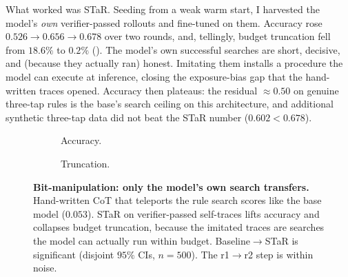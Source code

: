 \documentclass[11pt]{article}
\begin{document}
What worked was STaR. Seeding from a weak warm start, I harvested the model's \emph{own}
verifier-passed rollouts and fine-tuned on them. Accuracy rose $0.526\!\to\!0.656\!\to\!0.678$
over two rounds, and, tellingly, budget truncation fell from $18.6\%$ to $0.2\%$
(). The model's own successful searches are short, decisive, and (because
they actually ran) honest. Imitating them installs a procedure the model can execute at
inference, closing the exposure-bias gap that the hand-written traces opened. Accuracy then
plateaus: the residual $\approx\!0.50$ on genuine three-tap rules is the base's search
ceiling on this architecture, and additional synthetic three-tap data did not beat the STaR
number ($0.602 < 0.678$).

\begin{figure}[tbp]
\centering
\begin{subfigure}{0.48\textwidth}
\centering
{}
\caption{Accuracy.}
\end{subfigure}\hfill
\begin{subfigure}{0.48\textwidth}
\centering
{}
\caption{Truncation.}
\end{subfigure}
\caption{\textbf{Bit-manipulation: only the model's own search transfers.} Hand-written CoT
that teleports the rule search scores like the base model ($0.053$). STaR on
verifier-passed self-traces lifts accuracy and collapses budget truncation, because the
imitated traces are searches the model can actually run within budget. Baseline$\to$STaR is
significant (disjoint $95\%$ CIs, $n{=}500$). The r1$\to$r2 step is within noise.}
\label{fig:bitstar}
\end{figure}
\end{document}
